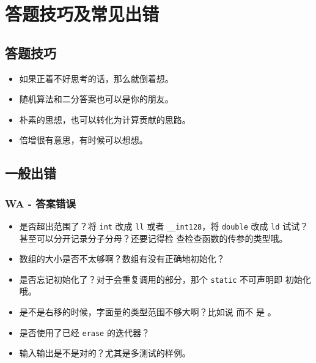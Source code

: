 \chapter{答题技巧及常见出错}





\section{答题技巧}
\begin{itemize}
    \item 如果正着不好思考的话，那么就倒着想。
    \item 随机算法和二分答案也可以是你的朋友。
    \item 朴素的思想，也可以转化为计算贡献的思路。
    \item 倍增很有意思，有时候可以想想。
\end{itemize}





\section{一般出错}



\subsection{WA - 答案错误}
\begin{itemize}
    \item 是否超出范围了？将 \verb|int| 改成 \verb|ll| 或者 \verb|__int128|，将
        \verb|double| 改成 \verb|ld| 试试？甚至可以分开记录分子分母？还要记得检
        查检查函数的传参的类型哦。
    \item 数组的大小是否不太够啊？数组有没有正确地初始化？
    \item 是否忘记初始化了？对于会重复调用的部分，那个 \verb|static| 不可声明即
        初始化哦。
    \item 是不是右移的时候，字面量的类型范围不够大啊？比如说  而不
        是 。
    \item 是否使用了已经 \verb|erase| 的迭代器？
    \item 输入输出是不是对的？尤其是多测试的样例。
\end{itemize}



